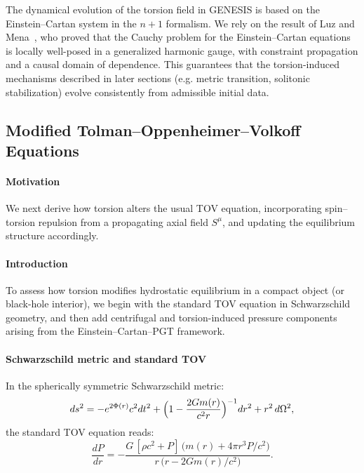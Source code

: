 \documentclass{article}
\begin{document}
\medskip
\begin{center}
\end{center}


The dynamical evolution of the torsion field in GENESIS is based on the Einstein–Cartan system in the \( n + 1 \) formalism.
We rely on the result of Luz and Mena~\cite{LuzMena2025}, who proved that the Cauchy problem for the Einstein–Cartan equations is locally well-posed in a generalized harmonic gauge, with constraint propagation and a causal domain of dependence.
This guarantees that the torsion-induced mechanisms described in later sections (e.g. metric transition, solitonic stabilization) evolve consistently from admissible initial data.




\subsection{Modified Tolman--Oppenheimer--Volkoff Equations}
\label{sec:modified-tov}

\paragraph{Motivation}
We next derive how torsion alters the usual TOV equation, incorporating spin–torsion repulsion from a propagating axial field $S^\mu$, and updating the equilibrium structure accordingly.

\paragraph{Introduction}
To assess how torsion modifies hydrostatic equilibrium in a compact object (or black-hole interior), we begin with the standard TOV equation in Schwarzschild geometry, and then add centrifugal and torsion-induced pressure components arising from the Einstein–Cartan–PGT framework.

\paragraph{Schwarzschild metric and standard TOV}
In the spherically symmetric Schwarzschild metric:
\[
  ds^2 = -e^{2\Phi(r)}c^2dt^2 
        + \Bigl(1-\frac{2Gm(r)}{c^2r}\Bigr)^{-1}dr^2 
        + r^2\,d\Omega^2,
\]
the standard TOV equation reads:
\[
  \frac{dP}{dr}
    = -\frac{G\,[\rho c^2 + P]\,\bigl(m(r) + 4\pi r^3P/c^2\bigr)}
           {r\,\bigl(r-2Gm(r)/c^2\bigr)}.
\]
\end{document}
